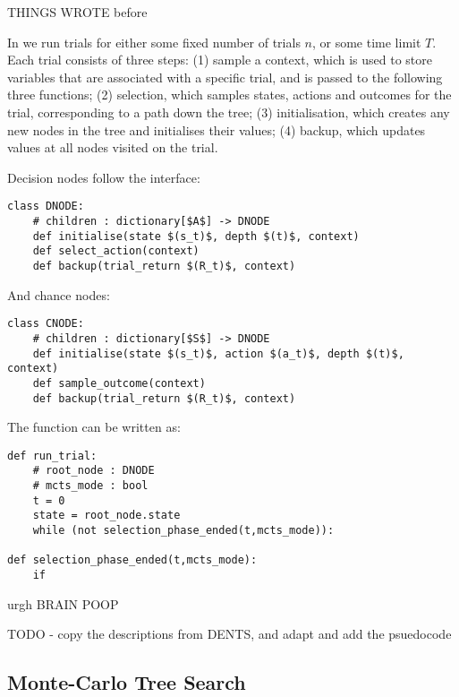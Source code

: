 \clearpage
THINGS WROTE before
\clearpage







        
        In \thtspp\ewe we run trials for either some fixed number of trials $n$, or some time limit $T$. Each trial 
        consists of three steps: 
        (1) sample a context, which is used to store variables that are associated with a specific trial, and is passed to the following three functions;
        (2) selection, which samples states, actions and outcomes for the trial, corresponding to a path down the tree;
        (3) initialisation, which creates any new nodes in the tree and initialises their values;
        (4) backup, which updates values at all nodes visited on the trial.

        Decision nodes follow the interface:
        \begin{lstlisting}
class DNODE:
    # children : dictionary[$A$] -> DNODE
    def initialise(state $(s_t)$, depth $(t)$, context)
    def select_action(context)
    def backup(trial_return $(R_t)$, context)
        \end{lstlisting}

        And chance nodes:
        \begin{lstlisting}
class CNODE:
    # children : dictionary[$S$] -> DNODE
    def initialise(state $(s_t)$, action $(a_t)$, depth $(t)$, context)
    def sample_outcome(context)
    def backup(trial_return $(R_t)$, context)
        \end{lstlisting}

        The \runtrial function can be written as:
        \begin{lstlisting}
def run_trial:
    # root_node : DNODE
    # mcts_mode : bool
    t = 0
    state = root_node.state
    while (not selection_phase_ended(t,mcts_mode)):

def selection_phase_ended(t,mcts_mode):
    if 
        \end{lstlisting}


        urgh BRAIN POOP

        TODO - copy the descriptions from DENTS, and adapt and add the psuedocode



    \subsection{Monte-Carlo Tree Search}
    \label{sec:2-2-2-mcts}

